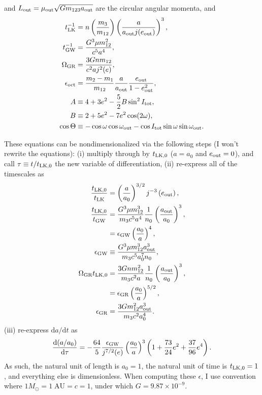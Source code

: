 \documentclass[10pt,
        twocolumn,
        fleqn,
    ]{revtex4-2}%
\newcommand*{\rd}[2]{\frac{\mathrm{d}#1}{\mathrm{d}#2}}
\newcommand*{\rdil}[2]{\mathrm{d}#1 / \mathrm{d}#2}
\newcommand*{\p}[1]{\left(#1\right)}
\begin{document}
and $L_{\rm out} = \mu_{\rm out}\sqrt{Gm_{123}a_{\rm out}}$ are the circular
angular momenta, and
\begin{align}
    t_{\rm LK}^{-1} &= n\p{\frac{m_3}{m_{12}}}\p{\frac{a}{a_{\rm out}j(e_{\rm
        out})}}^3,\\
    t_{\rm GW}^{-1} &= \frac{G^3\mu m_{12}^2}{c^5a^4},\\
    \Omega_{\rm GR} &= \frac{3Gnm_{12}}{c^2aj^2(e)},\\
    \epsilon_{\rm oct} &= \frac{m_2 - m_1}{m_{12}}\frac{a}{a_{\rm out}}
        \frac{e_{\rm out}}{1 - e_{\rm out}^2},\\
    A &\equiv 4 + 3e^2 - \frac{5}{2}B\sin^2 I_{\rm tot},\\
    B &\equiv 2 + 5e^2 - 7e^2 \cos(2\omega),\\
    \cos \Theta &\equiv -\cos \omega \cos \omega_{\rm out}
        - \cos I_{\rm tot} \sin \omega \sin \omega_{\rm out}.
\end{align}

These equations can be nondimensionalized via the following steps (I won't
rewrite the equations): (i) multiply through by $t_{\rm LK, 0}$ ($a = a_0$ and
$e_{\rm out} = 0$), and call $\tau \equiv t / t_{\rm LK, 0}$ the new variable of
differentiation, (ii) re-express all of the timescales as
\begin{align}
    \frac{t_{\rm LK, 0}}{t_{\rm LK}} &= \p{\frac{a}{a_0}}^{3/2}
        j^{-3}\p{e_{\rm out}},\\
    \frac{t_{\rm LK, 0}}{t_{\rm GW}} &=
        \frac{G^3\mu m_{12}^3}{m_3c^5a^4}\frac{1}{n_0}\p{\frac{a_{\rm out}
            }{a_0}}^3,\nonumber\\
        &= \epsilon_{\rm GW}\p{\frac{a_0}{a}}^4,\\
    \epsilon_{\rm GW} &\equiv \frac{G^3\mu m_{12}^3
        a_{\rm out}^3}{m_3c^5a_0^7 n_0},\\
    \Omega_{\rm GR}t_{\rm LK, 0} &= \frac{3Gnm_{12}^2}{m_3c^2a}
        \frac{1}{n_0}\p{\frac{a_{\rm out}}{a_0}}^3,\nonumber\\
        &= \epsilon_{\rm GR} \p{\frac{a_0}{a}}^{5/2},\\
    \epsilon_{\rm GR} &= \frac{3Gm_{12}^2a_{\rm out}^3}{m_3c^2a_0^4}.
\end{align}
(iii) re-express $\rdil{a}{t}$ as
\begin{equation}
    \rd{(a / a_0)}{\tau} = -\frac{64}{5}\frac{\epsilon_{\rm GW}}{
        j^{7/2}(e)}\p{\frac{a_0}{a}}^3\p{1 + \frac{73}{24}e^2 +
        \frac{37}{96}e^4}.
\end{equation}
As such, the natural unit of length is $a_0 = 1$, the natural unit of time is
$t_{\rm LK, 0} = 1$, and everything else is dimensionless. When computing these
$\epsilon$, I use convention where $1 M_{\odot} = 1\;\mathrm{AU} = c = 1$, under
which $G = 9.87 \times 10^{-9}$.
\end{document}
